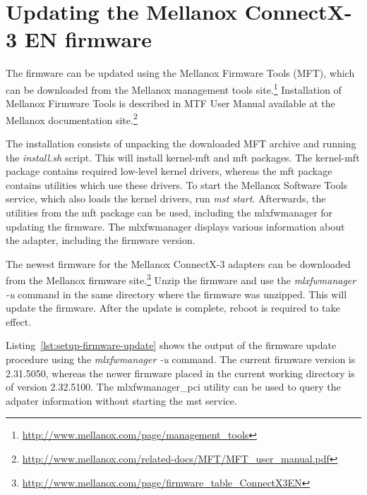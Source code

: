 \chapter{Updating the Mellanox ConnectX-3 EN firmware}\label{app:firmware}
The firmware can be updated using the Mellanox Firmware Tools (MFT), which can be downloaded
from the Mellanox management tools site.\footnote{{\url{http://www.mellanox.com/page/management_tools}}}
Installation of Mellanox Firmware Tools is described in MTF User Manual available at
the Mellanox documentation site.\footnote{{\url{http://www.mellanox.com/related-docs/MFT/MFT_user_manual.pdf}}}

The installation consists of unpacking the downloaded MFT archive and running the {\it{install.sh}} script.
This will install kernel-mft and mft packages.
The kernel-mft package contains required low-level kernel drivers, whereas the mft package contains utilities which use these drivers.
To start the Mellanox Software Tools service, which also loads the kernel drivers, run {\it{mst start}}.
Afterwards, the utilities from the mft package can be used, including the mlxfwmanager for updating the firmware.
The mlxfwmanager displays various information about the adapter, including the firmware version.

The newest firmware for the Mellanox ConnectX-3 adapters can be downloaded
from the Mellanox firmware site.\footnote{{\url{http://www.mellanox.com/page/firmware_table_ConnectX3EN}}}
Unzip the firmware and use the {\it{mlxfwmanager -u}} command in the same directory where the firmware was unzipped.
This will update the firmware.
After the update is complete, reboot is required to take effect.

Listing~\ref{lst:setup-firmware-update} shows the output of the firmware update procedure using the {\it{mlxfwmanager -u}} command.
The current firmware version is 2.31.5050, whereas the newer firmware placed in the current working directory is of version 2.32.5100.
The mlxfwmanager\_pci utility can be used to query the adpater information without starting the mst service.

\newpage

